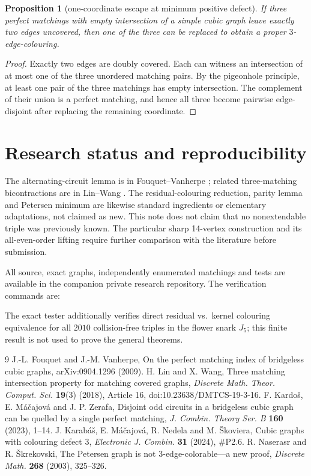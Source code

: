 \documentclass[11pt]{article}
\newtheorem{proposition}{Proposition}
\begin{document}
\begin{proposition}[one-coordinate escape at minimum positive defect]
If three perfect matchings with empty intersection of a simple cubic graph leave exactly two edges uncovered, then one of the three can be replaced to obtain a proper $3$-edge-colouring.
\end{proposition}
\begin{proof}
Exactly two edges are doubly covered. Each can witness an intersection of at most one of the three unordered matching pairs. By the pigeonhole principle, at least one pair of the three matchings has empty intersection. The complement of their union is a perfect matching, and hence all three become pairwise edge-disjoint after replacing the remaining coordinate.
\end{proof}

\section{Research status and reproducibility}
The alternating-circuit lemma is in Fouquet--Vanherpe \cite{FV09}; related three-matching bicontractions are in Lin--Wang \cite{LW18}. The residual-colouring reduction, parity lemma and Petersen minimum are likewise standard ingredients or elementary adaptations, not claimed as new. This note does not claim that no nonextendable triple was previously known. The particular sharp 14-vertex construction and its all-even-order lifting require further comparison with the literature before submission.

All source, exact graphs, independently enumerated matchings and tests are available in the companion private research repository. The verification commands are:\par{}\par{}\par The exact tester additionally verifies direct residual vs.~kernel colouring equivalence for all $2010$ collision-free triples in the flower snark $J_5$; this finite result is not used to prove the general theorems.

\begin{thebibliography}{9}
 J.-L. Fouquet and J.-M. Vanherpe, On the perfect matching index of bridgeless cubic graphs, arXiv:0904.1296 (2009).
 H. Lin and X. Wang, Three matching intersection property for matching covered graphs, \emph{Discrete Math. Theor. Comput. Sci.} \textbf{19}(3) (2018), Article 16, doi:10.23638/DMTCS-19-3-16.
 F. Kardo\v{s}, E. M\'a\v{c}ajov\'a and J. P. Zerafa, Disjoint odd circuits in a bridgeless cubic graph can be quelled by a single perfect matching, \emph{J. Combin. Theory Ser. B} \textbf{160} (2023), 1--14.
 J. Karab\'a\v{s}, E. M\'a\v{c}ajov\'a, R. Nedela and M. \v{S}koviera, Cubic graphs with colouring defect 3, \emph{Electronic J. Combin.} \textbf{31} (2024), \#P2.6.
 R. Naserasr and R. \v{S}krekovski, The Petersen graph is not 3-edge-colorable---a new proof, \emph{Discrete Math.} \textbf{268} (2003), 325--326.
\end{thebibliography}
\end{document}
